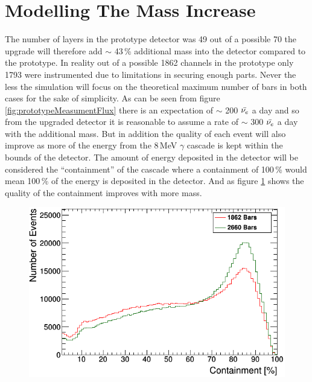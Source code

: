 \section{Modelling The Mass Increase}
The number of layers in the prototype detector was 49 out of a possible 70 the upgrade will therefore add $\sim$ 43\,\% additional mass into the detector compared to the prototype. In reality out of a possible 1862 channels in the prototype only 1793 were instrumented due to limitations in securing enough parts. Never the less the simulation will focus on the theoretical maximum number of bars in both cases for the sake of simplicity. As can be seen from figure \ref{fig:prototypeMeasumentFlux} there is an expectation of $\sim$ 200 $\Bar{\nu_e}$ a day and so from the upgraded detector it is reasonable to assume a rate of $\sim$ 300 $\Bar{\nu_e}$ a day with the additional mass. But in addition the quality of each event will also improve as more of the energy from the 8\,MeV $\gamma$ cascade is kept within the bounds of the detector. The amount of energy deposited in the detector will be considered the ``containment'' of the cascade where a containment of 100\,\% would mean 100\,\% of the energy is deposited in the detector. And as figure \ref{fig:containment_comparison} shows the quality of the containment improves with more mass. %

\begin{figure}[htbp]
 \centering
 \includegraphics[width=0.7\linewidth]{Chapter4/Figs/Raster/year1Plots/containment_Energy.png}
 \label{fig:containment_comparison}
\end{figure} 

